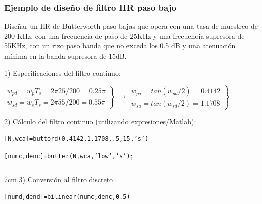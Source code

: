 \documentclass[handout]{beamer}
\numberwithin{section}{part}
\begin{document}



\begin{frame}
\frametitle{Ejemplo de diseño de filtro  IIR paso bajo}

\footnotesize
\color{olivegreen} Diseñar un IIR de Butterworth paso bajas que opera con una tasa de muestreo de 200 KHz, con una frecuencia de paso de 25KHz y una frecuencia supresora de 55KHz, con un rizo paso banda que no exceda los 0.5 dB y una atenuación mínima en la banda supresora de 15dB.
\color{gray}
\vspace{0.1cm}

1)  Especificaciones del filtro continuo:

\vspace{0.1cm}

$\left . \begin{array}{l}w_{pd}=w_pT_s=2\pi 25/200=0.25\pi\\w_{sd}=w_sT_s=2\pi 55/200=0.55\pi\end{array}\right \}$ $\rightarrow \left . \begin{array}{l}w_{pa}=tan(w_{pd}/2)=0.4142\\w_{sa}=tan(w_{sd}/2)=1.1708\end{array}\right \}$

\vspace{0.1cm}

2) Cálculo del filtro continuo (utilizando expresiones/Matlab):

\vspace{0.1cm}

\hspace{0.3cm}\texttt{[N,wca]=buttord(0.4142,1.1708,.5,15,'s')}

\vspace{0.1cm}

\hspace{0.3cm}\texttt{[numc,denc]=butter(N,wca,'low','s')};

\vspace{0.1cm}

\begin{columns}[T]
\begin{column}{7cm}
3) Conversión al filtro discreto

\vspace{0.1cm}

\hspace{0.3cm}\texttt{[numd,dend]=bilinear(numc,denc,0.5)}

\vspace{0.1cm}


\end{column}
\end{columns}
\end{frame}
\end{document}
